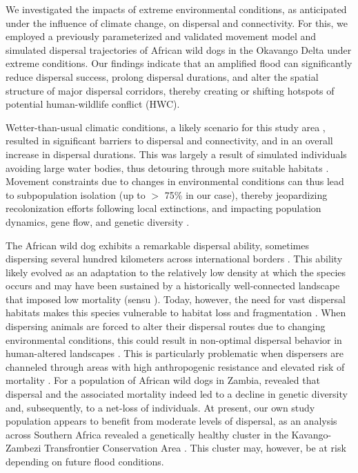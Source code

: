 \documentclass[../FinalThesis.tex]{subfiles}
\begin{document}
We investigated the impacts of extreme environmental conditions, as anticipated
under the influence of climate change, on dispersal and connectivity. For this,
we employed a previously parameterized and validated movement model and
simulated dispersal trajectories of African wild dogs in the Okavango Delta
under extreme conditions. Our findings indicate that an amplified flood can
significantly reduce dispersal success, prolong dispersal durations, and alter
the spatial structure of major dispersal corridors, thereby creating or
shifting hotspots of potential human-wildlife conflict (HWC).

Wetter-than-usual climatic conditions, a likely scenario for this study area
\citep{Wolski.2008, IPCC.2022}, resulted in significant barriers to dispersal
and connectivity, and in an overall increase in dispersal durations. This was
largely a result of simulated individuals avoiding large water bodies, thus
detouring through more suitable habitats \citep{Cozzi.2013, Cozzi.2020,
Hofmann.2021, Hofmann.2023}. Movement constraints due to changes in
environmental conditions can thus lead to subpopulation isolation (up to $>$
75\% in our case), thereby jeopardizing recolonization efforts following local
extinctions, and impacting population dynamics, gene flow, and genetic
diversity \citep{Hanski.1999, Frankham.2002, Leigh.2012, Baguette.2013}.

The African wild dog exhibits a remarkable dispersal ability, sometimes
dispersing several hundred kilometers across international borders
\citep{McNutt.1996, Davies-Mostert.2012, Masenga.2016, Cozzi.2020,
Sandoval-Seres.2022, Cozzi.2023}. This ability likely evolved as an adaptation
to the relatively low density at which the species occurs \citep{Creel.2002,
Masenga.2016} and may have been sustained by a historically well-connected
landscape that imposed low mortality (sensu \citealp{Fahrig.2007}). Today,
however, the need for vast dispersal habitats makes this species vulnerable to
habitat loss and fragmentation \citep{Woodroffe.2012, Woodroffe.2020}. When
dispersing animals are forced to alter their dispersal routes due to changing
environmental conditions, this could result in non-optimal dispersal behavior in
human-altered landscapes \citep{Fahrig.2007}. This is particularly problematic
when dispersers are channeled through areas with high anthropogenic resistance
and elevated risk of mortality \citep{Fahrig.2007, Ghoddousi.2021,
VanDerMeer.2014}. For a population of African wild dogs in Zambia,
\citet{Leigh.2012} revealed that dispersal and the associated mortality indeed
led to a decline in genetic diversity and, subsequently, to a net-loss of
individuals. At present, our own study population appears to benefit from
moderate levels of dispersal, as an analysis across Southern Africa revealed a
genetically healthy cluster in the Kavango-Zambezi Transfrontier Conservation
Area \citep{Tensen.2022}. This cluster may, however, be at risk depending on
future flood conditions.
\end{document}
